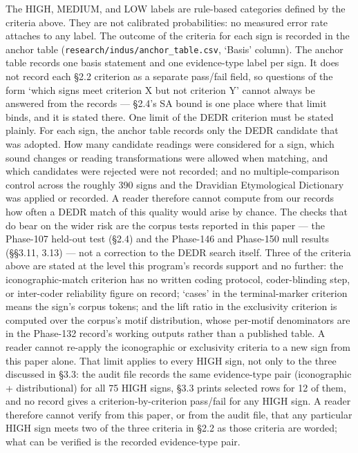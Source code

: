 \documentclass[
]{article}
\begin{document}
The HIGH, MEDIUM, and LOW labels are rule-based categories defined by the criteria above. They are not calibrated probabilities: no measured error rate attaches to any label. The outcome of the criteria for each sign is recorded in the anchor table (\texttt{research/\allowbreak indus/\allowbreak anchor\_table.csv}, `Basis' column). The anchor table records one basis statement and one evidence-type label per sign. It does not record each §2.2 criterion as a separate pass/fail field, so questions of the form `which signs meet criterion X but not criterion Y' cannot always be answered from the records --- §2.4's SA bound is one place where that limit binds, and it is stated there. One limit of the DEDR criterion must be stated plainly. For each sign, the anchor table records only the DEDR candidate that was adopted. How many candidate readings were considered for a sign, which sound changes or reading transformations were allowed when matching, and which candidates were rejected were not recorded; and no multiple-comparison control across the roughly 390 signs and the Dravidian Etymological Dictionary was applied or recorded. A reader therefore cannot compute from our records how often a DEDR match of this quality would arise by chance. The checks that do bear on the wider risk are the corpus tests reported in this paper --- the Phase-107 held-out test (§2.4) and the Phase-146 and Phase-150 null results (§§3.11, 3.13) --- not a correction to the DEDR search itself. Three of the criteria above are stated at the level this program's records support and no further: the iconographic-match criterion has no written coding protocol, coder-blinding step, or inter-coder reliability figure on record; `cases' in the terminal-marker criterion means the sign's corpus tokens; and the lift ratio in the exclusivity criterion is computed over the corpus's motif distribution, whose per-motif denominators are in the Phase-132 record's working outputs rather than a published table. A reader cannot re-apply the iconographic or exclusivity criteria to a new sign from this paper alone. That limit applies to every HIGH sign, not only to the three discussed in §3.3: the audit file records the same evidence-type pair (iconographic + distributional) for all 75 HIGH signs, §3.3 prints selected rows for 12 of them, and no record gives a criterion-by-criterion pass/fail for any HIGH sign. A reader therefore cannot verify from this paper, or from the audit file, that any particular HIGH sign meets two of the three criteria in §2.2 as those criteria are worded; what can be verified is the recorded evidence-type pair.
\end{document}

